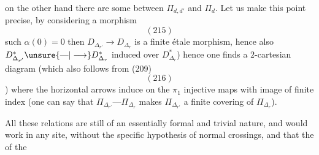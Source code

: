 on the other hand there are some between $\Pi_{d,d'}$ and $\Pi_d$.
Let us make this point precise, by considering a
morphism
\[
(215)
\]
such  $\alpha(0)=0$
then $D_{\Delta_{r'}}\longrightarrow D_{\Delta_r}$ is a finite étale
morphism, hence also $D^*_{\Delta_{r'}}\unsure{\text{---}|\longrightarrow}D^*_{\Delta_r}$ induced
over $D^*_{\Delta_r}$) hence one finds
a $2$-cartesian diagram (which 
 also follows from (209)
\[
(216)
\]
)
where the horizontal arrows induce on
the $\pi_1$ injective maps with
image of finite index (one can say that
$\Pi_{\Delta_{r'}}\text{---}\Pi_{\Delta_r}$ makes $\Pi_{\Delta_{r'}}$ a
finite covering of $\Pi_{\Delta_r}$).

All these relations are still of
an essentially formal and trivial nature,
and would work in any site,
without the specific hypothesis of normal
crossings, and  that the  of the
